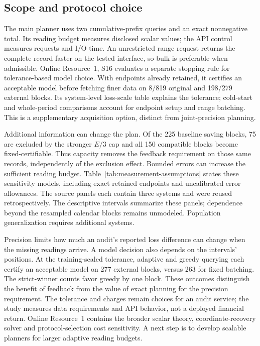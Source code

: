 \subsection{Scope and protocol choice}
The main planner uses two cumulative-prefix queries and an exact
nonnegative total. Its reading budget measures disclosed scalar values;
the API control measures requests and I/O time. An unrestricted range
request returns the complete record faster on the tested interface, so
bulk is preferable when admissible. Online Resource~1, S16 evaluates a
separate stopping rule for tolerance-based model choice. With endpoints
already retained, it certifies an acceptable model before fetching finer
data on 8/819 original and 198/279 external blocks. Its system-level
loss-scale table explains the tolerance; cold-start and whole-period
comparisons account for endpoint setup and range batching. This is a
supplementary acquisition option, distinct from joint-precision planning.

Additional information can change the plan. Of the 225 baseline saving
blocks, 75 are excluded by the stronger $E/3$ cap and all 150 compatible
blocks become fixed-certifiable. Thus capacity removes the feedback
requirement on those same records, independently of the exclusion effect.
Bounded errors can increase the sufficient reading budget.
Table~\ref{tab:measurement-assumptions} states these sensitivity models,
including exact retained endpoints and uncalibrated error allowances.
The source panels each contain three systems and were reused retrospectively.
The descriptive intervals summarize these panels; dependence beyond the
resampled calendar blocks remains unmodeled. Population generalization
requires additional systems.

Precision limits how much an audit's reported loss difference can change
when the missing readings arrive. A model decision also depends on the
intervals' positions. At the training-scaled tolerance, adaptive and greedy
querying each certify an acceptable model on 277 external blocks, versus
263 for fixed batching. The strict-winner counts favor greedy by one block.
These outcomes distinguish the benefit
of feedback from the value of exact planning for the precision requirement.
The tolerance and charges remain choices for an audit service; the study
measures data requirements and API behavior, not a deployed financial return.
Online Resource~1 contains the
broader scalar theory, coordinate-recovery solver and protocol-selection
cost sensitivity. A next step is to develop scalable planners for larger
adaptive reading budgets.

